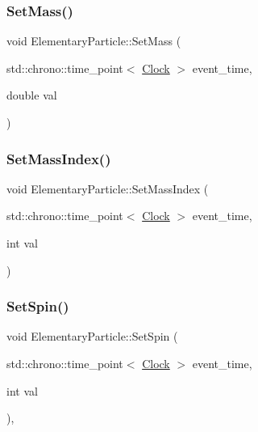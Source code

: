 \subsubsection{\texorpdfstring{Set\+Mass()}{SetMass()}}
{\footnotesize\ttfamily void Elementary\+Particle\+::\+Set\+Mass (\begin{DoxyParamCaption}\item[{std\+::chrono\+::time\+\_\+point$<$ \mbox{\hyperlink{universe_8h_a0ef8d951d1ca5ab3cfaf7ab4c7a6fd80}{Clock}} $>$}]{event\+\_\+time,  }\item[{double}]{val }\end{DoxyParamCaption})}

\mbox{\label{classElementaryParticle_a8a3b91409772f4091a782624a34024e7}} 
\subsubsection{\texorpdfstring{Set\+Mass\+Index()}{SetMassIndex()}}
{\footnotesize\ttfamily void Elementary\+Particle\+::\+Set\+Mass\+Index (\begin{DoxyParamCaption}\item[{std\+::chrono\+::time\+\_\+point$<$ \mbox{\hyperlink{universe_8h_a0ef8d951d1ca5ab3cfaf7ab4c7a6fd80}{Clock}} $>$}]{event\+\_\+time,  }\item[{int}]{val }\end{DoxyParamCaption})}

\mbox{\label{classElementaryParticle_a437fa86d88157314b84662b158d52353}} 
\subsubsection{\texorpdfstring{Set\+Spin()}{SetSpin()}}
{\footnotesize\ttfamily void Elementary\+Particle\+::\+Set\+Spin (\begin{DoxyParamCaption}\item[{std\+::chrono\+::time\+\_\+point$<$ \mbox{\hyperlink{universe_8h_a0ef8d951d1ca5ab3cfaf7ab4c7a6fd80}{Clock}} $>$}]{event\+\_\+time,  }\item[{int}]{val }\end{DoxyParamCaption})\hspace{0.3cm}{\ttfamily [inline]}, {\ttfamily [virtual]}}




